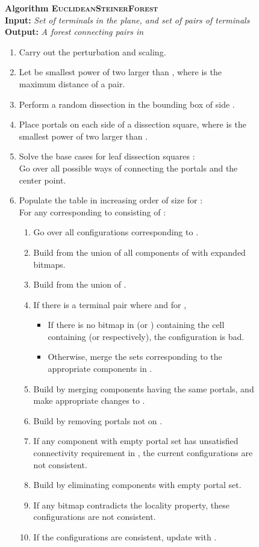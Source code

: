 \documentclass[extras,11pt]{article} \usepackage{fullpage}
\makeatletter
\theoremstyle{mytheorem}
\newcommand{\algo}[1]{\textsc{#1}}
\newcommand{\algtitle}[1]{\vspace{.1cm}\textbf{#1}}
\newcommand{\alginput}[1]{\\\textbf{Input:} \textit{#1}}
\newcommand{\algoutput}[1]{\\\textbf{Output:} \textit{#1}}
{\makeatletter
 \gdef\xxxmark{\expandafter\ifx\csname @mpargs\endcsname\relax \expandafter\ifx\csname @captype\endcsname\relax \marginpar{xxx}\else
       xxx \fi
   \else
     xxx \fi}
 \gdef\xxx{\@ifnextchar[\xxx@lab\xxx@nolab}
 \long\gdef\xxx@lab[#1]#2{{\bf [\xxxmark #2 ---{\sc #1}]}}
 \long\gdef\xxx@nolab#1{{\bf [\xxxmark #1]}}
}
\makeatother
\begin{document}
\begin{figure}
\begin{algorithm}
\algtitle{Algorithm \algo{EuclideanSteinerForest}}
\alginput{Set of terminals  in the plane, and set  of pairs of terminals}
\algoutput{A forest  connecting pairs in }
\begin{enumerate}\setlength{\itemsep}{-.00in}
\item Carry out the perturbation and scaling.
\item Let  be smallest power of two larger than , where  is the maximum distance of a pair.
\item Perform a random dissection in the bounding box of side .
\item Place  portals on each side of a dissection square, where  is the smallest power of two larger than  .
\item Solve the base cases  for leaf dissection squares :\\
Go over all possible ways of connecting the portals and the center point.
\item Populate the table  in increasing order of size for :\\
      For any  corresponding to  consisting of :
\begin{enumerate}\setlength{\itemsep}{-.02in}
 \item Go over all configurations  corresponding to .
 \item Build  from the union of all components of  with expanded bitmaps.
 \item Build  from the union of .
 \item If there is a terminal pair  where  and  for ,
\begin{itemize}\setlength{\itemsep}{-.02in}
 \item If there is no bitmap in  (or ) containing the cell containing  (or  respectively), the configuration is bad.
 \item Otherwise, merge the sets corresponding to the appropriate components in .
\end{itemize}
 \item Build  by merging components having the same portals,
  and make appropriate changes to .
 \item Build  by removing portals not on .
 \item If any component with empty portal set has unsatisfied connectivity requirement in , the current configurations are not consistent.
 \item Build  by eliminating components with empty portal set.
 \item If any bitmap contradicts the locality property, these configurations are not consistent.
 \item If the configurations are consistent, update  with .


\end{enumerate}
\end{enumerate}
\end{algorithm}
\end{figure}
\end{document}
